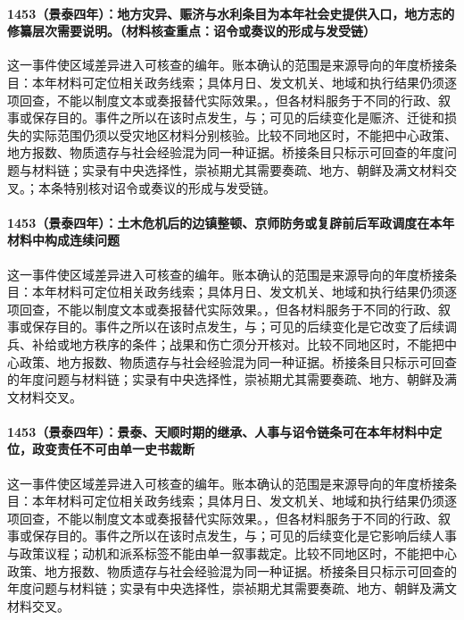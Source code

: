 \paragraph{1453（景泰四年）：地方灾异、赈济与水利条目为本年社会史提供入口，地方志的修纂层次需要说明。（材料核查重点：诏令或奏议的形成与发受链）} 这一事件使区域差异进入可核查的编年。账本确认的范围是来源导向的年度桥接条目：本年材料可定位相关政务线索；具体月日、发文机关、地域和执行结果仍须逐项回查，不能以制度文本或奏报替代实际效果。，但各材料服务于不同的行政、叙事或保存目的。事件之所以在该时点发生，与；可见的后续变化是赈济、迁徙和损失的实际范围仍须以受灾地区材料分别核验。比较不同地区时，不能把中心政策、地方报数、物质遗存与社会经验混为同一种证据。桥接条目只标示可回查的年度问题与材料链；实录有中央选择性，崇祯期尤其需要奏疏、地方、朝鲜及满文材料交叉。；本条特别核对诏令或奏议的形成与发受链。

\paragraph{1453（景泰四年）：土木危机后的边镇整顿、京师防务或复辟前后军政调度在本年材料中构成连续问题} 这一事件使区域差异进入可核查的编年。账本确认的范围是来源导向的年度桥接条目：本年材料可定位相关政务线索；具体月日、发文机关、地域和执行结果仍须逐项回查，不能以制度文本或奏报替代实际效果。，但各材料服务于不同的行政、叙事或保存目的。事件之所以在该时点发生，与；可见的后续变化是它改变了后续调兵、补给或地方秩序的条件；战果和伤亡须分开核对。比较不同地区时，不能把中心政策、地方报数、物质遗存与社会经验混为同一种证据。桥接条目只标示可回查的年度问题与材料链；实录有中央选择性，崇祯期尤其需要奏疏、地方、朝鲜及满文材料交叉。

\paragraph{1453（景泰四年）：景泰、天顺时期的继承、人事与诏令链条可在本年材料中定位，政变责任不可由单一史书裁断} 这一事件使区域差异进入可核查的编年。账本确认的范围是来源导向的年度桥接条目：本年材料可定位相关政务线索；具体月日、发文机关、地域和执行结果仍须逐项回查，不能以制度文本或奏报替代实际效果。，但各材料服务于不同的行政、叙事或保存目的。事件之所以在该时点发生，与；可见的后续变化是它影响后续人事与政策议程；动机和派系标签不能由单一叙事裁定。比较不同地区时，不能把中心政策、地方报数、物质遗存与社会经验混为同一种证据。桥接条目只标示可回查的年度问题与材料链；实录有中央选择性，崇祯期尤其需要奏疏、地方、朝鲜及满文材料交叉。

